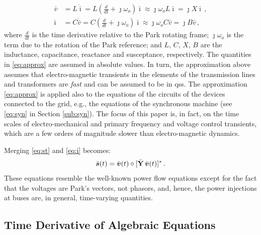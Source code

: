 \documentclass[journal, twocolumn, letter]{IEEEtran}
\newcommand{\bfg}[1]{\boldsymbol{#1}}
\newcommand{\bfp}[1]{\bar{\boldsymbol{#1}}}
\newcommand{\bfb}[1]{\boldsymbol{\rm #1}}
\newcommand{\Dt}{\dot}
\newcommand{\wo}{\omega_o}
\newcommand{\ii}{\imath}
\newcommand{\jj}{\jmath}
\newcommand{\svec}{\bar{\bfg s}}
\newcommand{\Ybus}{\bar{\bfb Y}}
\begin{document}
\begin{equation}
  \label{eq:approx}
  \begin{aligned}
    \bar v &= L \Dt {\bar \ii} = L (\frac{d}{dt} + \jj \wo ) \bar \ii
    \approx \jj \wo L \bar \ii = \jj X \bar \ii \, , \\
    \bar \ii &= C \Dt {\bar v} = C (\frac{d}{dt} + \jj \wo ) \bar \ii
    \approx \jj \wo C \bar v = \jj B \bar v \, ,    
  \end{aligned}
\end{equation}
where $\frac{d}{dt}$ is the time derivative relative to the Park
rotating frame; $\jj \wo$ is the term due to the rotation of the Park
reference; and  $L$, $C$, $X$, $B$ are the inductance,
capacitance, reactance and susceptance, respectively.  The quantities
in \eqref{eq:approx} are assumed in absolute values.
In turn, the approximation above assumes that electro-magnetic
transients in the elements of the transmission lines and transformers
are \textit{fast} and can be assumed to be in \ac{qss}.  
The approximation \eqref{eq:approx} is applied also to the equations
of the circuits of the devices connected to the grid, e.g., the
equations of the synchronous machine (see \eqref{eq:syn} in Section
\ref{sub:syn}).  The focus of this paper is, in fact, on
the time scales of electro-mechanical and primary frequency and
voltage control transients, which are a few orders of magnitude slower
than electro-magnetic dynamics.

Merging \eqref{eq:st} and \eqref{eq:i} becomes:
\begin{equation}
  \label{eq:s}
  \begin{aligned}
    \svec(t) = \bfp v(t) \circ [ \Ybus \, \bfp v(t)]^* \, .
  \end{aligned}
\end{equation}
These equations resemble the well-known power flow equations except
for the fact that the voltages {are Park's vectors, not
  phasors,} and, hence, the power injections at buses are, in general,
time-varying quantities.

\subsection{Time Derivative of Algebraic Equations}
\label{sub:ydot}
\end{document}
